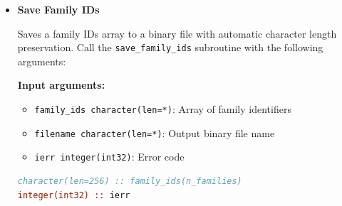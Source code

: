 \begin{enumerate}
\begin{itemize}
                  Loads a gene to family mapping array from a binary file with automatic
                  allocation. Call the \texttt{load\_gene\_to\_family} subroutine with the
                  following arguments:
                  
                  \textbf{Input arguments:}
                  \begin{itemize}
                    \item \texttt{filename character(len=*)}: Input binary file name
                          
                    \item \texttt{ierr integer(int32)}: Error code
                  \end{itemize}
                  \textbf{Output arguments:}
                  \begin{itemize}
                    \item \texttt{gene\_to\_family integer(int32), allocatable}: Loaded gene
                          to family mapping
                  \end{itemize}
                  \begin{lstlisting}[language=Fortran, caption={Load Gene-Family Mapping}]
integer(int32), allocatable :: loaded_gene_to_fam(:)
integer(int32) :: ierr

call load_gene_to_family(loaded_gene_to_fam, 'gene_to_fam.bin', ierr)
                  \end{lstlisting}
                  
            \item \textbf{Save Family IDs}
                  
                  Saves a family IDs array to a binary file with automatic character length
                  preservation. Call the \texttt{save\_family\_ids} subroutine with the following
                  arguments:
                  
                  \textbf{Input arguments:}
                  \begin{itemize}
                    \item \texttt{family\_ids character(len=*)}: Array of family identifiers
                          
                    \item \texttt{filename character(len=*)}: Output binary file name
                          
                    \item \texttt{ierr integer(int32)}: Error code
                  \end{itemize}
                  \begin{lstlisting}[language=Fortran, caption={Save Family IDs}]
character(len=256) :: family_ids(n_families)
integer(int32) :: ierr


\end{lstlisting}
\end{itemize}
\end{enumerate}
